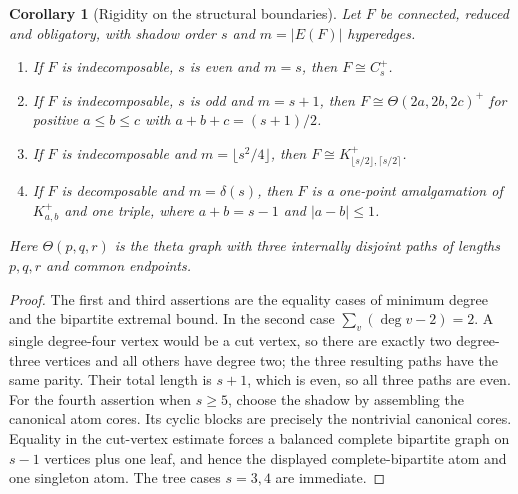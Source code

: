 \documentclass[a4paper,11pt,reqno]{amsart}
\theoremstyle{plain}
\newtheorem{corollary}[theorem]{Corollary}
\theoremstyle{definition}
\theoremstyle{remark}
\begin{document}
\begin{corollary}[Rigidity on the structural boundaries]
\label{corollary-structural-boundary-rigidity}
Let $F$ be connected, reduced and obligatory, with shadow order $s$ and
$m=|E(F)|$ hyperedges.
\begin{enumerate}
\item If $F$ is indecomposable, $s$ is even and $m=s$, then
$F\cong C_s^+$.
\item If $F$ is indecomposable, $s$ is odd and $m=s+1$, then
$F\cong\Theta(2a,2b,2c)^+$ for positive $a\le b\le c$ with
$a+b+c=(s+1)/2$.
\item If $F$ is indecomposable and $m=\lfloor s^2/4\rfloor$, then
$F\cong K_{\lfloor s/2\rfloor,\lceil s/2\rceil}^+$.
\item If $F$ is decomposable and $m=\delta(s)$, then $F$ is a one-point
amalgamation of $K_{a,b}^+$ and one triple, where
$a+b=s-1$ and $|a-b|\le1$.
\end{enumerate}
Here $\Theta(p,q,r)$ is the theta graph with three internally disjoint paths
of lengths $p,q,r$ and common endpoints.
\end{corollary}
\begin{proof}
The first and third assertions are the equality cases of minimum degree and
the bipartite extremal bound.  In the second case
$\sum_v(\deg v-2)=2$.  A single degree-four vertex would be a cut vertex, so
there are exactly two degree-three vertices and all others have degree two;
the three resulting paths have the same parity.  Their total length is
$s+1$, which is even, so all three paths are even.  For the fourth assertion
when $s\ge5$, choose the shadow by assembling the canonical atom cores.  Its
cyclic blocks are precisely the nontrivial canonical cores.  Equality in the cut-vertex estimate
forces a balanced complete bipartite graph on $s-1$ vertices plus one leaf,
and hence the displayed complete-bipartite atom and one singleton atom.
The tree cases $s=3,4$ are immediate.
\end{proof}
\end{document}
